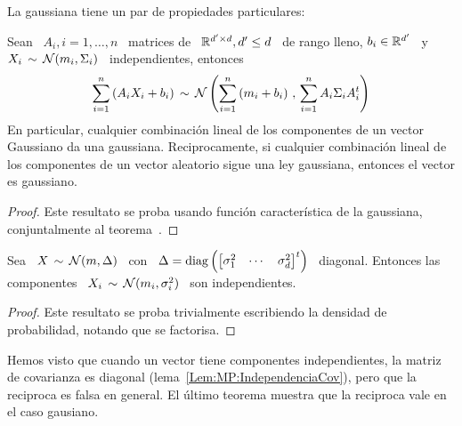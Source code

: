 La gaussiana tiene un par de propiedades particulares:
%
\begin{teorema}[Stabilidad]
\label{Teo:MP:StabilidadGaussiana}
%
  Sean \ $A_i , i = 1,\ldots,n$ \  matrices de \ $\mathbb{R}^{d' \times d}, d' \le d$
  \ de rango lleno, $b_i \in \mathbb{R}^{d'}$ \ y \ $X_i \, \sim \, \mathcal{N}(m_i,\Sigma_i)$
  \ independientes, entonces
  \[
  \sum_{i=1}^n \left(  A_i X_i  + b_i \right)  \, \sim \,  \mathcal{N}\left( \sum_{i=1}^n
    \left( m_i + b_i \right) \, , \, \sum_{i=1}^n A_i \Sigma_i A_i^t \right)
  \]
  En particular, cualquier combinaci\'on lineal  de los componentes de un vector
  Gaussiano da una gaussiana.  Reciprocamente, si cualquier combinaci\'on lineal
  de los componentes de un vector aleatorio sigue una ley gaussiana, entonces el
  vector es gaussiano.
\end{teorema}
%
\begin{proof}
  Este  resultato se proba  usando funci\'on  caracter\'istica de  la gaussiana,
  conjuntalmente al teorema~\cite{Teo:MP:PropiedadesFuncionCaracteristica}.
\end{proof}

%
\begin{teorema}[Independencia]
\label{Teo:MP:IndependenciaGaussiana}
%
  Sea   \   $X  \,   \sim   \,   \mathcal{N}(m,\Delta)$  \   con   \   $\Delta  =   \operatorname{diag}
  \left(  \begin{bmatrix}  \sigma_1^2  &  \cdots  &  \sigma_d^2  \end{bmatrix}^t
  \right)$   \  diagonal.   Entonces  las   componentes  \   $X_i  \,   \sim  \,
  \mathcal{N}(m_i,\sigma_i^2)$ \ son independientes.
\end{teorema}
%
\begin{proof}
  Este resultato se proba  trivialmente escribiendo la densidad de probabilidad,
  notando que se factorisa.
\end{proof}
%
Hemos visto que cuando un  vector tiene componentes independientes, la matriz de
covarianza  es   diagonal  (lema~\ref{Lem:MP:IndependenciaCov}),  pero   que  la
reciproca es falsa en general. El \'ultimo teorema muestra que la reciproca vale
en el caso gausiano.



